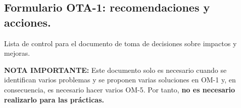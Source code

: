 \documentclass[12pt,a4paper,twoside,spanish]{article}      %
\begin{document}
\subsection{Formulario OTA-1: recomendaciones y acciones.}



{\color{blue} Lista de control para el documento de toma de decisiones sobre impactos y mejoras.

\textbf{NOTA IMPORTANTE: } Este documento solo es necesario cuando se identifican varios problemas y se proponen varias soluciones en OM-1 y, en consecuencia, es necesario hacer varios OM-5. Por tanto, \textbf{no es necesario realizarlo para las prácticas.} }




\vspace*{1cm}
\end{document}
